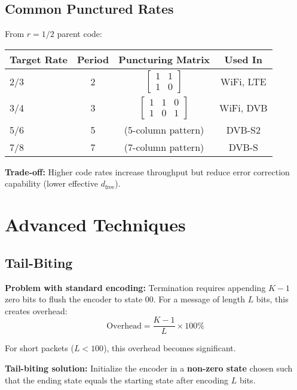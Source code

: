 \subsection{Common Punctured Rates}

From $r=1/2$ parent code:

\begin{center}
\begin{tabular}{@{}lccc@{}}
\toprule
\textbf{Target Rate} & \textbf{Period} & \textbf{Puncturing Matrix} & \textbf{Used In} \\
\midrule
2/3 & 2 & $\begin{bmatrix} 1 & 1 \\ 1 & 0 \end{bmatrix}$ & WiFi, LTE \\[0.3em]
3/4 & 3 & $\begin{bmatrix} 1 & 1 & 0 \\ 1 & 0 & 1 \end{bmatrix}$ & WiFi, DVB \\[0.3em]
5/6 & 5 & (5-column pattern) & DVB-S2 \\
7/8 & 7 & (7-column pattern) & DVB-S \\
\bottomrule
\end{tabular}
\end{center}

\textbf{Trade-off:} Higher code rates increase throughput but reduce error correction capability (lower effective $d_{\text{free}}$).

\section{Advanced Techniques}

\subsection{Tail-Biting}

\textbf{Problem with standard encoding:} Termination requires appending $K-1$ zero bits to flush the encoder to state 00. For a message of length $L$ bits, this creates overhead:
\begin{equation}
\text{Overhead} = \frac{K-1}{L} \times 100\%
\end{equation}

For short packets ($L < 100$), this overhead becomes significant.

\textbf{Tail-biting solution:} Initialize the encoder in a \textbf{non-zero state} chosen such that the ending state equals the starting state after encoding $L$ bits.

